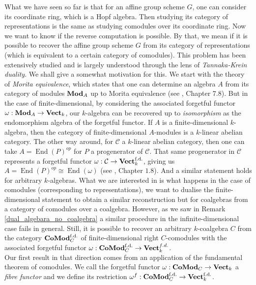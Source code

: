 \documentclass{article}
\theoremstyle{plain}
\theoremstyle{definition}
\DeclareMathOperator{\End}{End}
\DeclareMathOperator{\Vect}{\bf{Vect}}
\DeclareMathOperator{\Mod}{\bf{Mod}}
\DeclareMathOperator{\Comod}{\bf{CoMod}}
\begin{document}
What we have seen so far is that for an affine group scheme $G$, one can consider its coordinate ring, which is a Hopf algebra.
Then studying its category of representations is the same as studying comodules over its coordinate ring.
Now we want to know if the reverse computation is possible.
By that, we mean if it is possible to recover the affine group scheme $G$ from its category of representations (which is equivalent to a certain category of comodules).
This problem has been extensively studied and is largely understood through the lens of \textit{Tannaka-Krein duality}. 
We shall give a somewhat motivation for this.
We start with the theory of \textit{Morita equivalence}, which states that one can determine an algebra $A$ from its category of modules $\Mod_A$ up to Morita equivalence (see \cite{Etingof}, Chapter $7.8$).
But in the case of finite-dimensional, by considering the associated forgetful functor $\omega:\Mod_A\rightarrow \Vect_k$, our $k$-algebra can be recovered up to \textit{isomorphism} as the endomorphism algebra of the forgetful functor.
If $A$ is a finite-dimensional $k$-algebra, then the category of finite-dimensional $A$-modules is a $k$-linear abelian category. 
The other way around, for $\mathcal{C}$ a $k$-linear abelian category, then one can take $A=\End(P)^{op}$ for $P$ a progenerator of $\mathcal{C}$. That same progenerator in $\mathcal{C}$ represents a forgetful functor $\omega :\mathcal{C}\rightarrow \Vect^{\text{f.d.}}_k$, giving us $A = \End(P)^{op} \cong \End(\omega)$ (see \cite{Etingof}, Chapter $1.8$).
And a similar statement holds for arbitrary $k$-algebras.
What we are interested in is what happens in the case of comodules (corresponding to representations), we want to dualise the finite-dimensional statement to obtain a similar reconstruction but for coalgebras from a category of comodules over a coalgebra.
However, as we saw in Remark \ref{dual_algebara_no_coalgebra} a similar procedure in the infinite-dimensional case fails in general.
Still, it is possible to recover an arbitrary $k$-coalgebra $C$ from the category $\Comod^{\text{f.d.}}_C$ of finite-dimensional right $C$-comodules with the associated forgetful functor $\omega :\Comod^{\text{f.d.}}_C\rightarrow \Vect^{f.d.}_k$.  \\
Our first result in that direction comes from an application of the fundamental theorem of comodules. 
We call the forgetful functor $\omega :\Comod_C\rightarrow \Vect_k$ a \textit{fibre functor} and we define its restriction $\omega^f: \Comod^{\text{f.d.}}_C\rightarrow \Vect^{\text{f.d.}}_k$.
\end{document}

